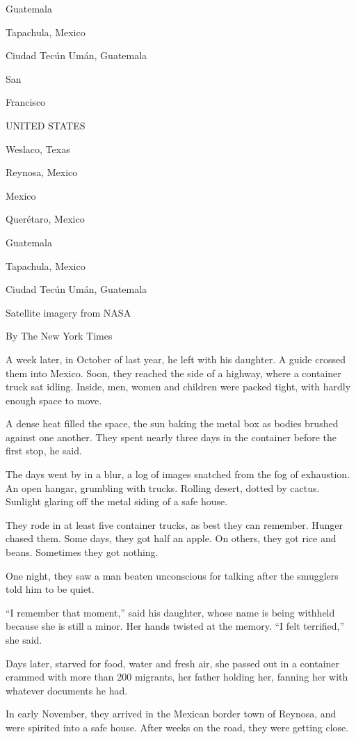 Guatemala

Tapachula, Mexico

Ciudad Tecún Umán, Guatemala

San

Francisco

UNITED STATES

Weslaco, Texas

Reynosa, Mexico

Mexico

Querétaro, Mexico

Guatemala

Tapachula, Mexico

Ciudad Tecún Umán, Guatemala

Satellite imagery from NASA

By The New York Times

A week later, in October of last year, he left with his daughter. A
guide crossed them into Mexico. Soon, they reached the side of a
highway, where a container truck sat idling. Inside, men, women and
children were packed tight, with hardly enough space to move.

A dense heat filled the space, the sun baking the metal box as bodies
brushed against one another. They spent nearly three days in the
container before the first stop, he said.

The days went by in a blur, a log of images snatched from the fog of
exhaustion. An open hangar, grumbling with trucks. Rolling desert,
dotted by cactus. Sunlight glaring off the metal siding of a safe house.

They rode in at least five container trucks, as best they can remember.
Hunger chased them. Some days, they got half an apple. On others, they
got rice and beans. Sometimes they got nothing.

One night, they saw a man beaten unconscious for talking after the
smugglers told him to be quiet.

``I remember that moment,'' said his daughter, whose name is being
withheld because she is still a minor. Her hands twisted at the memory.
``I felt terrified,'' she said.

Days later, starved for food, water and fresh air, she passed out in a
container crammed with more than 200 migrants, her father holding her,
fanning her with whatever documents he had.

In early November, they arrived in the Mexican border town of Reynosa,
and were spirited into a safe house. After weeks on the road, they were
getting close.

